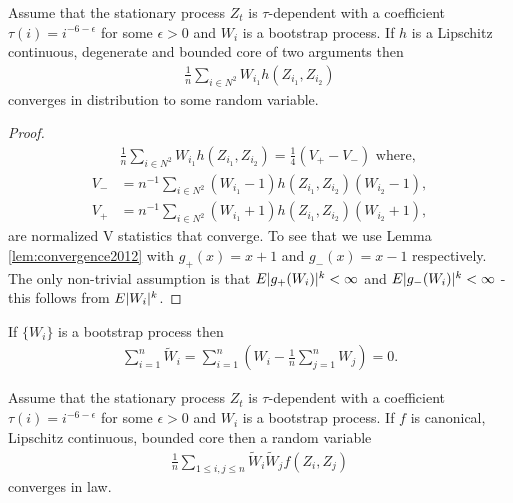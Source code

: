 \begin{lemma}
\label{lem:oneWtrick}
Assume that the stationary process $Z_t$ is $\tau$-dependent with a coefficient $\tau(i) = i^{-6-\epsilon}$ for some $\epsilon>0$ and $W_i$ is a bootstrap process. If $h$ is a Lipschitz continuous, degenerate and bounded core of two arguments then 
\begin{align}
\frac{1}{n} \sum_{i \in N^2} W_{i_1} h(Z_{i_1},Z_{i_2}) 
\end{align}
converges in distribution to some random variable.
\end{lemma}
\begin{proof}
\begin{align}
& \frac{1}{n} \sum_{i \in N^2} W_{i_1}  h(Z_{i_1},Z_{i_2}) = \frac 1 4 (V_{+}-V_{-}) \text{ where,} \\   
V_{-} &= n^{-1} \sum_{i \in N^2} (W_{i_1}-1)h(Z_{i_1},Z_{i_2})(W_{i_2}-1), \\
V_{+} &= n^{-1} \sum_{i \in N^2}  (W_{i_1}+1)h(Z_{i_1},Z_{i_2})(W_{i_2}+1),
\end{align}
are normalized V statistics that converge. To see that we use Lemma \ref{lem:convergence2012} with $g_{+}(x)=x+1$ and $g_{-}(x)=x-1$ respectively. The only non-trivial assumption is that $E|g_{+}(W_i)|^k < \infty$ and $E|g_{-}(W_i)|^k<\infty$  - this follows from $E |W_i|^k$. 
\end{proof}







\begin{lemma}
\label{stmt:obviousD}
If $\{W_i\}$ is a bootstrap process then
\begin{align}
\sum_{i=1}^n \tilde W_i = \sum_{i=1}^n  \left( W_i - \frac 1 n \sum_{j=1}^n  W_j \right) = 0. 
\end{align}
\end{lemma}

\begin{lemma}
\label{lem:convergenceProblem}
Assume that the stationary process $Z_t$ is $\tau$-dependent with a coefficient $\tau(i) = i^{-6-\epsilon}$ for some $\epsilon>0$ and $W_i$ is a bootstrap process. If $f$ is canonical, Lipschitz continuous, bounded core then a random variable 
\begin{align}
\frac 1 n  \sum_{1 \leq i,j \leq n} \tilde W_i \tilde W_j f(Z_i,Z_j)
\end{align}
converges in law.
\end{lemma}

